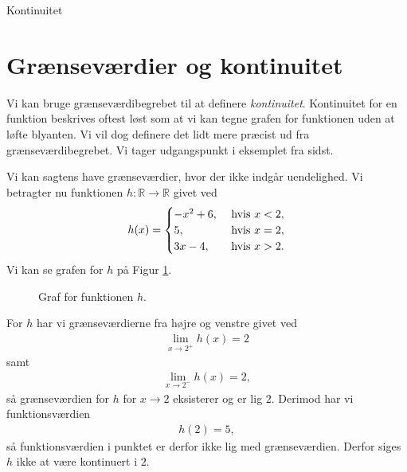 \begin{center}
	\Huge
	Kontinuitet
\end{center}


\section*{Grænseværdier og kontinuitet}

Vi kan bruge grænseværdibegrebet til at definere \textit{kontinuitet}.
Kontinuitet for en funktion beskrives oftest løst som at vi kan tegne grafen for funktionen uden at løfte blyanten.
Vi vil dog definere det lidt mere præcist ud fra grænseværdibegrebet.
Vi tager udgangspunkt i eksemplet fra sidst. 

\begin{exa}
	Vi kan sagtens have grænseværdier, hvor der ikke indgår uendelighed. Vi betragter nu funktionen 
	$h:\mathbb{R} \to \mathbb{R}$ givet ved
	\begin{align*}
		h(x) = 
		\begin{cases}
		-x^2 + 6, \ &\textnormal{hvis } x < 2, \\
		5, &\textnormal{hvis } x = 2, \\
		3x - 4, &\textnormal{hvis } x > 2. 
		\end{cases}
	\end{align*}
	Vi kan se grafen for $h$ på Figur \ref{fig:grænse3}.
	\begin{figure}[H]
	\centering
	\caption{Graf for funktionen $h$.}
	\label{fig:grænse3}
	\end{figure}
	For $h$ har vi grænseværdierne fra højre og venstre givet ved 
	\begin{align*}
		\lim_{x \to 2^+} h(x) = 2
	\end{align*}
	samt 
	\begin{align*}
		\lim_{x \to 2^-}h(x) = 2,
	\end{align*}
	så grænseværdien for $h$ for $x \to 2$ eksisterer og er lig $2$. Derimod har vi funktionsværdien 
	\begin{align*}
		h(2) = 5, 
	\end{align*}
	så funktionsværdien i punktet er derfor ikke lig med grænseværdien. Derfor siges $h$ ikke at være 
	kontinuert i $2$. 


\end{exa}
